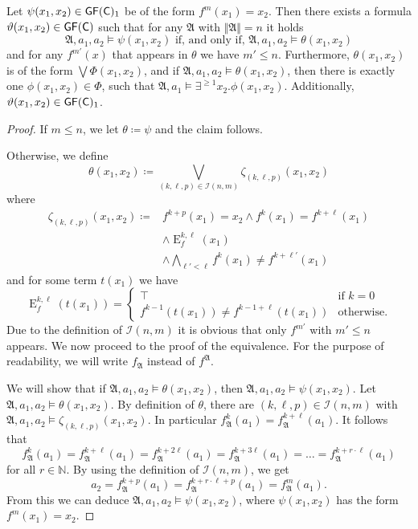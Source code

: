 \begin{lemma}
	Let $\psi(x_1,x_2)\in \mathsf{GF}(\mathsf{C})_1$ be of the form $f^m(x_1)=x_2$. 
	Then there exists a formula $\vartheta(x_1,x_2)\in \mathsf{GF}(\mathsf{C})$ such that for any $\mathfrak A$ with $\Vert \mathfrak A\Vert=n$ it holds
	$$\mathfrak A,a_1,a_2 \models \psi(x_1,x_2) \text{ if, and only if, } \mathfrak A,a_1,a_2 \models \theta(x_1,x_2)$$ 
	and for any $f^{m'}(x)$ that appears in $\theta$ we have $m'\leq n$.
	Furthermore, $\theta(x_1,x_2)$ is of the form $\bigvee \Phi(x_1,x_2)$, and if $\mathfrak A,a_1,a_2\models \theta(x_1,x_2)$, then there is exactly one $\phi(x_1,x_2)\in\Phi$, such that $\mathfrak A,a_1\models \exists^{\geq 1} x_2 . \phi(x_1,x_2)$.
	Additionally, $\vartheta(x_1,x_2)\in \mathsf{GF}(\mathsf{C})_1$.
	\label{Simple_fm_to_fk}
\end{lemma}
\begin{proof}
	If $m \leq n$, we let $\theta\coloneqq\psi$ and the claim follows.
	
	Otherwise, we define
	$$\theta(x_1,x_2)\coloneqq \bigvee_{(k,\ell,p)\in \mathcal I(n,m)} \zeta_{(k,\ell,p)}(x_1,x_2)$$
	where
	\begin{align*}
		\zeta_{(k,\ell,p)}(x_1,x_2)\coloneqq & f^{k+p}(x_1)=x_2 \land f^{k}(x_1)=f^{k+\ell}(x_1) \\
		& \land \operatorname{E}^{k,\ell}_{f}(x_1)  \\
		& \land \bigwedge_{\ell'<\ell}f^{k}(x_1)\neq f^{k+\ell'}(x_1)
	\end{align*}
	and for some term $t(x_1)$ we have
	$$\operatorname{E}^{k,\ell}_{f}(t(x_1))=\begin{cases}
		\top & \text{if } k=0 \\
		f^{k-1}(t(x_1))\neq f^{k-1+\ell}(t(x_1)) & \text{otherwise}.
	\end{cases}$$
	Due to the definition of $\mathcal I(n,m)$ it is obvious that only $f^{m'}$ with $m'\leq n$ appears.
	We now proceed to the proof of the equivalence.
	For the purpose of readability, we will write $f_{\mathfrak A}$ instead of $f^{\mathfrak A}$.
	
	We will show that if $\mathfrak A,a_1,a_2 \models \theta(x_1,x_2)$, then $\mathfrak A,a_1,a_2 \models \psi(x_1,x_2)$.
	Let $\mathfrak A,a_1,a_2 \models \theta(x_1,x_2)$. 
	By definition of $\theta$, there are $(k,\ell,p)\in \mathcal I(n,m)$ with $\mathfrak A,a_1,a_2 \models \zeta_{(k,\ell,p)}(x_1,x_2)$.
	In particular $f_{\mathfrak A}^{k}(a_1)=f_{\mathfrak A}^{k+\ell}(a_1)$. It follows that
	$$f_{\mathfrak A}^{k}(a_1)=f_{\mathfrak A}^{k+\ell}(a_1)=f_{\mathfrak A}^{k+2\ell}(a_1)=f_{\mathfrak A}^{k+3\ell}(a_1) = \dots = f_{\mathfrak A}^{k+r\cdot \ell}(a_1)$$
	for all $r\in \mathbb N$. By using the definition of $\mathcal{I}(n,m)$, we get
	$$a_2 =f_{\mathfrak A}^{k+p}(a_1) = f_{\mathfrak A}^{k+r\cdot \ell + p}(a_1)=f_{\mathfrak A}^{m}(a_1).$$
	From this we can deduce $\mathfrak A,a_1,a_2\models \psi(x_1,x_2)$, where $\psi(x_1,x_2)$ has the form $f^{m}(x_1)=x_2$.
	

\end{proof}
